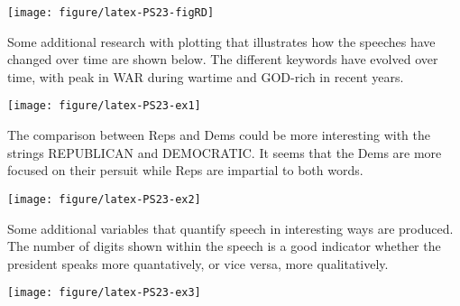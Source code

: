 \documentclass{article}\usepackage{graphicx, color}
\makeatletter
\def\maxwidth{ %
  \ifdim\Gin@nat@width>\linewidth
    \linewidth
  \else
    \Gin@nat@width
  \fi
}
\newenvironment{knitrout}{}{} %
\makeatother
\begin{document}
\begin{knitrout}
\color{fgcolor}

{\centering \texttt{[image: figure/latex-PS23-figRD]} 

}


\end{knitrout}


\newpage
Some additional research with plotting that illustrates how the speeches have changed over time are shown below.
The different keywords have evolved over time, with peak in WAR during wartime and GOD-rich in recent years.


\begin{knitrout}
\color{fgcolor}

{\centering \texttt{[image: figure/latex-PS23-ex1]} 

}


\end{knitrout}


The comparison between Reps and Dems could be more interesting with the strings REPUBLICAN and DEMOCRATIC.
It seems that the Dems are more focused on their persuit while Reps are impartial to both words.

\begin{knitrout}
\color{fgcolor}

{\centering \texttt{[image: figure/latex-PS23-ex2]} 

}


\end{knitrout}



Some additional variables that quantify speech in interesting ways are produced. The number of digits shown within the
speech is a good indicator whether the president speaks more quantatively, or vice versa, more qualitatively.

\begin{knitrout}
\color{fgcolor}

{\centering \texttt{[image: figure/latex-PS23-ex3]} 

}


\end{knitrout}
\end{document}
